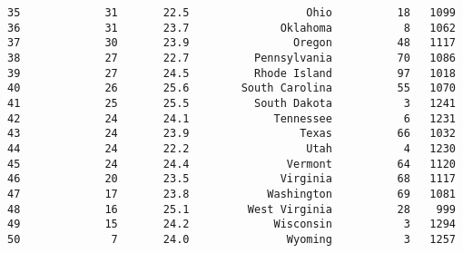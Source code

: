 \documentclass[11pt]{article}
\begin{document}
\begin{Verbatim}[commandchars=\\\{\}]
35             31       22.5                  Ohio          18   1099   
36             31       23.7              Oklahoma           8   1062   
37             30       23.9                Oregon          48   1117   
38             27       22.7          Pennsylvania          70   1086   
39             27       24.5          Rhode Island          97   1018   
40             26       25.6        South Carolina          55   1070   
41             25       25.5          South Dakota           3   1241   
42             24       24.1             Tennessee           6   1231   
43             24       23.9                 Texas          66   1032   
44             24       22.2                  Utah           4   1230   
45             24       24.4               Vermont          64   1120   
46             20       23.5              Virginia          68   1117   
47             17       23.8            Washington          69   1081   
48             16       25.1         West Virginia          28    999   
49             15       24.2             Wisconsin           3   1294   
50              7       24.0               Wyoming           3   1257   


\end{Verbatim}
\end{document}
